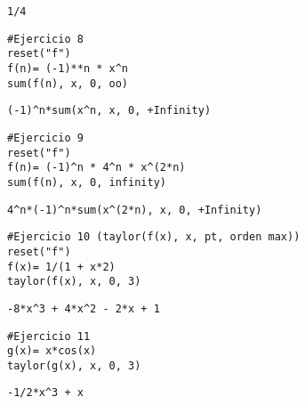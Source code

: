 \documentclass[
]{article}
\begin{document}
\begin{verbatim}
1/4
\end{verbatim}

\begin{verbatim}
#Ejercicio 8
reset("f")
f(n)= (-1)**n * x^n
sum(f(n), x, 0, oo)
\end{verbatim}

\begin{verbatim}
(-1)^n*sum(x^n, x, 0, +Infinity)
\end{verbatim}

\begin{verbatim}
#Ejercicio 9
reset("f")
f(n)= (-1)^n * 4^n * x^(2*n)
sum(f(n), x, 0, infinity)
\end{verbatim}

\begin{verbatim}
4^n*(-1)^n*sum(x^(2*n), x, 0, +Infinity)
\end{verbatim}

\begin{verbatim}
#Ejercicio 10 (taylor(f(x), x, pt, orden max))
reset("f")
f(x)= 1/(1 + x*2)
taylor(f(x), x, 0, 3)
\end{verbatim}

\begin{verbatim}
-8*x^3 + 4*x^2 - 2*x + 1
\end{verbatim}

\begin{verbatim}
#Ejercicio 11
g(x)= x*cos(x)
taylor(g(x), x, 0, 3)
\end{verbatim}

\begin{verbatim}
-1/2*x^3 + x
\end{verbatim}
\end{document}
